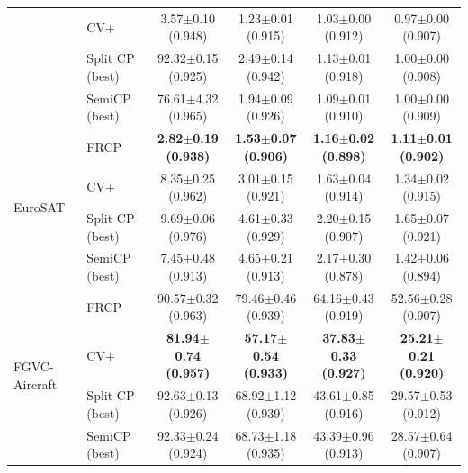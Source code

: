 \begin{table}[t]
\begin{tabular}{llcccc}
 & CV+ & 3.57$\pm$0.10 {\scriptsize(0.948)} & 1.23$\pm$0.01 {\scriptsize(0.915)} & 1.03$\pm$0.00 {\scriptsize(0.912)} & 0.97$\pm$0.00 {\scriptsize(0.907)}\\
 & Split CP (best) & 92.32$\pm$0.15 {\scriptsize(0.925)} & 2.49$\pm$0.14 {\scriptsize(0.942)} & 1.13$\pm$0.01 {\scriptsize(0.918)} & 1.00$\pm$0.00 {\scriptsize(0.908)}\\
 & SemiCP (best) & 76.61$\pm$4.32 {\scriptsize(0.965)} & 1.94$\pm$0.09 {\scriptsize(0.926)} & 1.09$\pm$0.01 {\scriptsize(0.910)} & 1.00$\pm$0.00 {\scriptsize(0.909)}\\
\midrule
\multirow{4}{*}{EuroSAT} & FRCP & \textbf{2.82$\pm$0.19 {\scriptsize(0.938)}} & \textbf{1.53$\pm$0.07 {\scriptsize(0.906)}} & \textbf{1.16$\pm$0.02 {\scriptsize(0.898)}} & \textbf{1.11$\pm$0.01 {\scriptsize(0.902)}}\\
 & CV+ & 8.35$\pm$0.25 {\scriptsize(0.962)} & 3.01$\pm$0.15 {\scriptsize(0.921)} & 1.63$\pm$0.04 {\scriptsize(0.914)} & 1.34$\pm$0.02 {\scriptsize(0.915)}\\
 & Split CP (best) & 9.69$\pm$0.06 {\scriptsize(0.976)} & 4.61$\pm$0.33 {\scriptsize(0.929)} & 2.20$\pm$0.15 {\scriptsize(0.907)} & 1.65$\pm$0.07 {\scriptsize(0.921)}\\
 & SemiCP (best) & 7.45$\pm$0.48 {\scriptsize(0.913)} & 4.65$\pm$0.21 {\scriptsize(0.913)} & 2.17$\pm$0.30 {\scriptsize(0.878)} & 1.42$\pm$0.06 {\scriptsize(0.894)}\\
\midrule
\multirow{4}{*}{FGVC-Aircraft} & FRCP & 90.57$\pm$0.32 {\scriptsize(0.963)} & 79.46$\pm$0.46 {\scriptsize(0.939)} & 64.16$\pm$0.43 {\scriptsize(0.919)} & 52.56$\pm$0.28 {\scriptsize(0.907)}\\
 & CV+ & \textbf{81.94$\pm$0.74 {\scriptsize(0.957)}} & \textbf{57.17$\pm$0.54 {\scriptsize(0.933)}} & \textbf{37.83$\pm$0.33 {\scriptsize(0.927)}} & \textbf{25.21$\pm$0.21 {\scriptsize(0.920)}}\\
 & Split CP (best) & 92.63$\pm$0.13 {\scriptsize(0.926)} & 68.92$\pm$1.12 {\scriptsize(0.939)} & 43.61$\pm$0.85 {\scriptsize(0.916)} & 29.57$\pm$0.53 {\scriptsize(0.912)}\\
 & SemiCP (best) & 92.33$\pm$0.24 {\scriptsize(0.924)} & 68.73$\pm$1.18 {\scriptsize(0.935)} & 43.39$\pm$0.96 {\scriptsize(0.913)} & 28.57$\pm$0.64 {\scriptsize(0.907)}\\
\bottomrule
\end{tabular}
\end{table}
